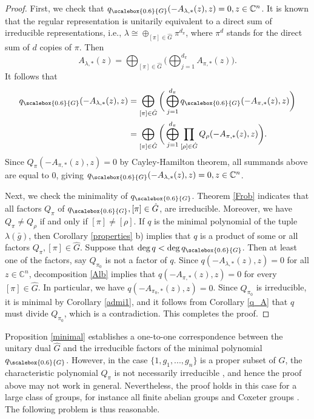 \documentclass[draft, 12pt, reqno]{amsart}
\newcommand{\C}{{\mathbb C}}
\newcommand{\lb}{{\lambda}}
\numberwithin{equation}{section}
\theoremstyle{plain}
\begin{document}
\begin{proof}
 First, we check that $q_{\scalebox{0.6}{G}}(-A_{\lb, *}(z), z)=0, z\in \C^n$. It is known that the regular representation is unitarily equivalent to a direct sum of irreducible representations, i.e., $\lb\cong\oplus_{[\pi]\in \hat{G}}\pi^{d_\pi}$, where $\pi^{d}$ stands for the direct sum of $d$ copies of $\pi$. Then 
 \begin{equation}\label{Alb}
 A_{\lb,*}(z)=\bigoplus_{[\pi]\in \hat{G}}\bigg(\bigoplus_{j=1}^{d_\pi}A_{\pi,*}(z)\bigg).
 \end{equation}
 \noindent It follows that
\begin{align*}
q_{\scalebox{0.6}{G}}(-A_{\lb,*}(z),z)&=\bigoplus_{[\pi]\in \hat{G}}\bigg(\bigoplus_{j=1}^{d_\pi}q_{\scalebox{0.6}{G}}(-A_{\pi,*}(z),z)\bigg)\\
    &=\bigoplus_{[\pi]\in \hat{G}}\bigg(\bigoplus_{j=1}^{d_\pi}\prod_{[\rho]\in \hat{G}} Q_\rho(-A_{\pi,*}(z),z)\bigg).
    \end{align*}
Since $Q_\pi(-A_{\pi,*}(z),z)=0$ by Cayley-Hamilton theorem, all summands above are equal to $0$, giving $q_{\scalebox{0.6}{G}}(-A_{\lb,*}(z),z)=0, z\in \C^n$.

Next, we check the minimality of $q_{\scalebox{0.6}{G}}$. Theorem \ref{Frob} indicates that all factors $Q_\pi$ of $q_{\scalebox{0.6}{G}}, [\pi]\in \hat{G}$, are irreducible. Moreover, we have $Q_\pi\neq Q_\rho$ if and only if $[\pi]\neq [\rho]$. If $q$ is the minimal polynomial of the tuple $\lb(\bar{g})$, then Corollary \ref{properties} b) implies that $q$ is a product of some or all factors $Q_\pi, [\pi]\in \hat{G}$. Suppose that $\deg q<\deg q_{\scalebox{0.6}{G}}$. Then at least one of the factors, say $Q_{\pi_0}$ is not a factor of $q$. Since $q(-A_{\lb,*}(z),z)=0$ for all $z\in \C^n$, decomposition \eqref{Alb} implies that $q(-A_{\pi,*}(z),z)=0$ for every $[\pi]\in \hat{G}$. In particular, we have $q(-A_{\pi_0,*}(z),z)=0$. Since $Q_{\pi_0}$ is irreducible, it is minimal by Corollary \ref{admi1}, and it follows from Corollary \ref{q_A} that $q$ must divide $Q_{\pi_0}$, which is a contradiction. This completes the proof.
\end{proof}

Proposition \ref{minimal} establishes a one-to-one correspondence between the unitary dual $\hat{G}$ and the irreducible factors of the minimal polynomial $q_{\scalebox{0.6}{G}}$. However, in the case $\{1, g_1, ..., g_n\}$ is a proper subset of $G$, the characteristic polynomial $Q_{\pi}$ is not necessarily irreducible \cite{KV}, and hence the proof above may not work in general. Nevertheless, the proof holds in this case for a large class of groups, for instance all finite abelian groups and Coxeter groups \cite{CST,Ya24}. The following problem is thus reasonable.
  
\end{document}
